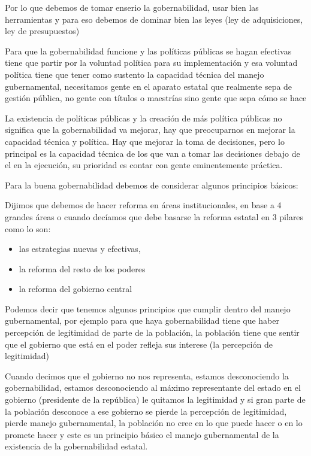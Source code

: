\documentclass[
  letterpaper,
  DIV=11,
  numbers=noendperiod]{scrartcl}
\providecommand{\tightlist}{%
  \setlength{\itemsep}{0pt}\setlength{\parskip}{0pt}}\usepackage{longtable,booktabs,array}
\begin{document}
Por lo que debemos de tomar enserio la gobernabilidad, usar bien las
herramientas y para eso debemos de dominar bien las leyes (ley de
adquisiciones, ley de presupuestos)

Para que la gobernabilidad funcione y las políticas públicas se hagan
efectivas tiene que partir por la voluntad política para su
implementación y esa voluntad política tiene que tener como sustento la
capacidad técnica del manejo gubernamental, necesitamos gente en el
aparato estatal que realmente sepa de gestión pública, no gente con
títulos o maestrías sino gente que sepa cómo se hace

La existencia de políticas públicas y la creación de más política
públicas no significa que la gobernabilidad va mejorar, hay que
preocuparnos en mejorar la capacidad técnica y política. Hay que mejorar
la toma de decisiones, pero lo principal es la capacidad técnica de los
que van a tomar las decisiones debajo de el en la ejecución, su
prioridad es contar con gente eminentemente práctica.

Para la buena gobernabilidad debemos de considerar algunos principios
básicos:

Dijimos que debemos de hacer reforma en áreas institucionales, en base a
4 grandes áreas o cuando decíamos que debe basarse la reforma estatal en
3 pilares como lo son:

\begin{itemize}
\tightlist
\item
  las estrategias nuevas y efectivas,
\item
  la reforma del resto de los poderes
\item
  la reforma del gobierno central
\end{itemize}

Podemos decir que tenemos algunos principios que cumplir dentro del
manejo gubernamental, por ejemplo para que haya gobernabilidad tiene que
haber percepción de legitimidad de parte de la población, la población
tiene que sentir que el gobierno que está en el poder refleja sus
interese (la percepción de legitimidad)

Cuando decimos que el gobierno no nos representa, estamos desconociendo
la gobernabilidad, estamos desconociendo al máximo representante del
estado en el gobierno (presidente de la república) le quitamos la
legitimidad y si gran parte de la población desconoce a ese gobierno se
pierde la percepción de legitimidad, pierde manejo gubernamental, la
población no cree en lo que puede hacer o en lo promete hacer y este es
un principio básico el manejo gubernamental de la existencia de la
gobernabilidad estatal.
\end{document}
